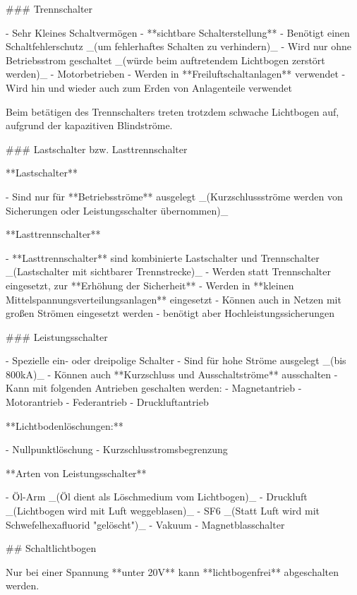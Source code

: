 \begin{markdown}
### Trennschalter

- Sehr Kleines Schaltvermögen
- **sichtbare Schalterstellung**
- Benötigt einen Schaltfehlerschutz _(um fehlerhaftes Schalten zu verhindern)_
- Wird nur ohne Betriebsstrom geschaltet _(würde beim auftretendem Lichtbogen zerstört werden)_
- Motorbetrieben
- Werden in **Freiluftschaltanlagen** verwendet
- Wird hin und wieder auch zum Erden von Anlagenteile verwendet

Beim betätigen des Trennschalters treten trotzdem schwache Lichtbogen auf, aufgrund der kapazitiven Blindströme.

### Lastschalter bzw. Lasttrennschalter

**Lastschalter**

- Sind nur für **Betriebsströme** ausgelegt _(Kurzschlussströme werden von Sicherungen oder Leistungsschalter übernommen)_

**Lasttrennschalter**

- **Lasttrennschalter** sind kombinierte Lastschalter und Trennschalter _(Lastschalter mit sichtbarer Trennstrecke)_
- Werden statt Trennschalter eingesetzt, zur **Erhöhung der Sicherheit**
- Werden in **kleinen Mittelspannungsverteilungsanlagen** eingesetzt
- Können auch in Netzen mit großen Strömen eingesetzt werden - benötigt aber Hochleistungssicherungen 

### Leistungsschalter

- Spezielle ein- oder dreipolige Schalter
- Sind für hohe Ströme ausgelegt _(bis 800kA)_ 
- Können auch **Kurzschluss und Ausschaltströme** ausschalten
- Kann mit folgenden Antrieben geschalten werden:
    - Magnetantrieb
    - Motorantrieb
    - Federantrieb
    - Druckluftantrieb

**Lichtbodenlöschungen:**

- Nullpunktlöschung
- Kurzschlusstromsbegrenzung

**Arten von Leistungsschalter**

- Öl-Arm _(Öl dient als Löschmedium vom Lichtbogen)_
- Druckluft _(Lichtbogen wird mit Luft weggeblasen)_
- SF6 _(Statt Luft wird mit Schwefelhexafluorid "gelöscht")_
- Vakuum
- Magnetblasschalter

\newpage

## Schaltlichtbogen


Nur bei einer Spannung **unter 20V** kann **lichtbogenfrei** abgeschalten werden.


\end{markdown}
